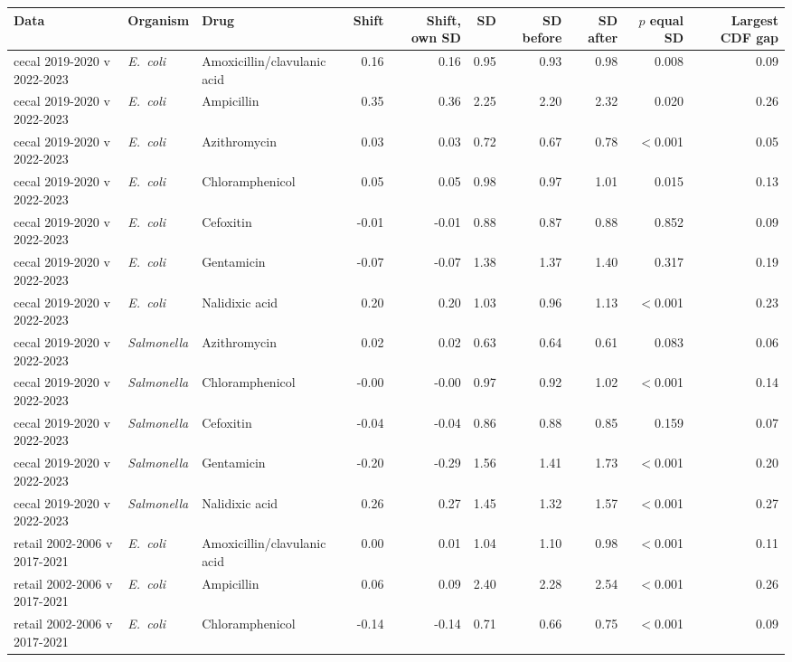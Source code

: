 \begin{table}[h]
\centering
\scriptsize
\begin{tabular}{lllrrrrrrr}
\toprule
Data & Organism & Drug & Shift & Shift, own SD & SD & SD before & SD after & $p$ equal SD & Largest CDF gap \\
\midrule
cecal 2019-2020 v 2022-2023 & \textit{E.~coli} & Amoxicillin/clavulanic acid & 0.16 & 0.16 & 0.95 & 0.93 & 0.98 & 0.008 & 0.09 \\
cecal 2019-2020 v 2022-2023 & \textit{E.~coli} & Ampicillin & 0.35 & 0.36 & 2.25 & 2.20 & 2.32 & 0.020 & 0.26 \\
cecal 2019-2020 v 2022-2023 & \textit{E.~coli} & Azithromycin & 0.03 & 0.03 & 0.72 & 0.67 & 0.78 & $<$0.001 & 0.05 \\
cecal 2019-2020 v 2022-2023 & \textit{E.~coli} & Chloramphenicol & 0.05 & 0.05 & 0.98 & 0.97 & 1.01 & 0.015 & 0.13 \\
cecal 2019-2020 v 2022-2023 & \textit{E.~coli} & Cefoxitin & -0.01 & -0.01 & 0.88 & 0.87 & 0.88 & 0.852 & 0.09 \\
cecal 2019-2020 v 2022-2023 & \textit{E.~coli} & Gentamicin & -0.07 & -0.07 & 1.38 & 1.37 & 1.40 & 0.317 & 0.19 \\
cecal 2019-2020 v 2022-2023 & \textit{E.~coli} & Nalidixic acid & 0.20 & 0.20 & 1.03 & 0.96 & 1.13 & $<$0.001 & 0.23 \\
cecal 2019-2020 v 2022-2023 & \textit{Salmonella} & Azithromycin & 0.02 & 0.02 & 0.63 & 0.64 & 0.61 & 0.083 & 0.06 \\
cecal 2019-2020 v 2022-2023 & \textit{Salmonella} & Chloramphenicol & -0.00 & -0.00 & 0.97 & 0.92 & 1.02 & $<$0.001 & 0.14 \\
cecal 2019-2020 v 2022-2023 & \textit{Salmonella} & Cefoxitin & -0.04 & -0.04 & 0.86 & 0.88 & 0.85 & 0.159 & 0.07 \\
cecal 2019-2020 v 2022-2023 & \textit{Salmonella} & Gentamicin & -0.20 & -0.29 & 1.56 & 1.41 & 1.73 & $<$0.001 & 0.20 \\
cecal 2019-2020 v 2022-2023 & \textit{Salmonella} & Nalidixic acid & 0.26 & 0.27 & 1.45 & 1.32 & 1.57 & $<$0.001 & 0.27 \\
retail 2002-2006 v 2017-2021 & \textit{E.~coli} & Amoxicillin/clavulanic acid & 0.00 & 0.01 & 1.04 & 1.10 & 0.98 & $<$0.001 & 0.11 \\
retail 2002-2006 v 2017-2021 & \textit{E.~coli} & Ampicillin & 0.06 & 0.09 & 2.40 & 2.28 & 2.54 & $<$0.001 & 0.26 \\
retail 2002-2006 v 2017-2021 & \textit{E.~coli} & Chloramphenicol & -0.14 & -0.14 & 0.71 & 0.66 & 0.75 & $<$0.001 & 0.09 \\

\end{tabular}
\end{table}

